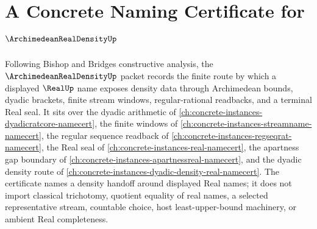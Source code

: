\chapter{A Concrete Naming Certificate for $\ArchimedeanRealDensityUp$}
\label{ch:concrete-instances-archimedean-real-density-namecert}

Following Bishop and Bridges constructive analysis, the
$\ArchimedeanRealDensityUp$ packet records the finite route by which a
displayed $\RealUp$ name exposes density data through Archimedean bounds,
dyadic brackets, finite stream windows, regular-rational readbacks, and a
terminal Real seal. It sits over the dyadic arithmetic of
\autoref{ch:concrete-instances-dyadicratcore-namecert}, the finite windows of
\autoref{ch:concrete-instances-streamname-namecert}, the regular sequence
readback of \autoref{ch:concrete-instances-regseqrat-namecert}, the Real seal
of \autoref{ch:concrete-instances-real-namecert}, the apartness gap boundary of
\autoref{ch:concrete-instances-apartnessreal-namecert}, and the dyadic
density route of \autoref{ch:concrete-instances-dyadic-density-real-namecert}.
The certificate names a density handoff around displayed Real names; it does
not import classical trichotomy, quotient equality of real names, a selected
representative stream, countable choice, host least-upper-bound machinery, or
ambient Real completeness.

